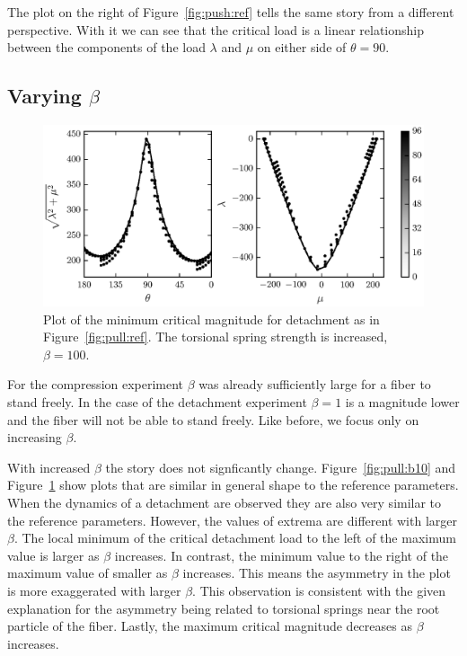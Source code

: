 {The plot on the right of Figure~\ref{fig:push:ref} tells the same story from a different perspective. With it we can see that the critical load is a linear relationship between the components of the load $\lambda$ and $\mu$ on either side of $\theta=90$\textdegree.
   
\subsection{Varying $\beta$}

   \begin{figure}[t]
      \begin{center}
         \includegraphics{./fig/ch3/pull/b100/grid.eps}
      \end{center}      
      \caption{Plot of the minimum critical magnitude for detachment as in Figure~\ref{fig:pull:ref}. The torsional spring strength is increased, $\beta=100$.
      \label{fig:pull:b100}}
   \end{figure}

For the compression experiment $\beta$ was already sufficiently large for a fiber to stand freely. In the case of the detachment experiment $\beta=1$ is a magnitude lower and the fiber will not be able to stand freely. Like before, we focus only on increasing $\beta$.

With increased $\beta$ the story does not signficantly change. Figure~\ref{fig:pull:b10} and Figure~\ref{fig:pull:b100} show plots that are similar in general shape to the reference parameters. When the dynamics of a detachment are observed they are also very similar to the reference parameters. However, the values of extrema are different with larger $\beta$. The local minimum of the critical detachment load to the left of the maximum value is larger as $\beta$ increases. In contrast, the minimum value to the right of the maximum value of smaller as $\beta$ increases. This means the asymmetry in the plot is more exaggerated with larger $\beta$. This observation is consistent with the given explanation for the asymmetry being related to torsional springs near the root particle of the fiber. Lastly, the maximum critical magnitude decreases as $\beta$ increases.

}
